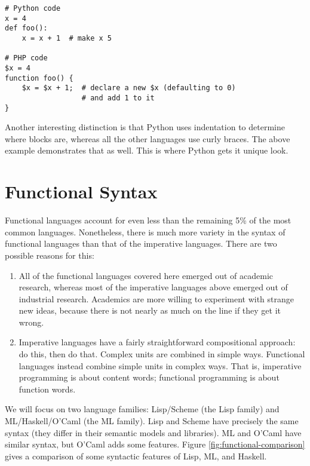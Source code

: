 \documentclass[12pt]{article}
\begin{document}
\begin{verbatim}
# Python code
x = 4
def foo():
    x = x + 1  # make x 5

# PHP code
$x = 4
function foo() {
    $x = $x + 1;  # declare a new $x (defaulting to 0)
                  # and add 1 to it
}
\end{verbatim}

Another interesting distinction is that Python uses indentation to
determine where blocks are, whereas all the other languages use curly
braces.  The above example demonstrates that as well.  This is where
Python gets it unique look.

\section{Functional Syntax}

Functional languages account for even less than the remaining 5\% of the
most common languages.  Nonetheless, there is much more variety in the
syntax of functional languages than that of the imperative languages.
There are two possible reasons for this: 

\begin{enumerate}
\item All of the functional languages covered here emerged out of
academic research, whereas most of the imperative languages above
emerged out of industrial research.  Academics are more willing to
experiment with strange new ideas, because there is not nearly as much
on the line if they get it wrong.  
\item Imperative languages have a fairly straightforward compositional
approach: do this, then do that.  Complex units are combined in simple
ways.  Functional languages instead combine simple units in complex
ways.  That is, imperative programming is about content words;
functional programming is about function words.
\end{enumerate}

We will focus on two language families: Lisp/Scheme (the Lisp family)
and ML/Haskell/O'Caml (the ML family). Lisp and Scheme have precisely
the same syntax (they differ in their semantic models and libraries).
ML and O'Caml have similar syntax, but O'Caml adds some features.  Figure
\ref{fig:functional-comparison} gives a comparison of some syntactic
features of Lisp, ML, and Haskell.
\end{document}

